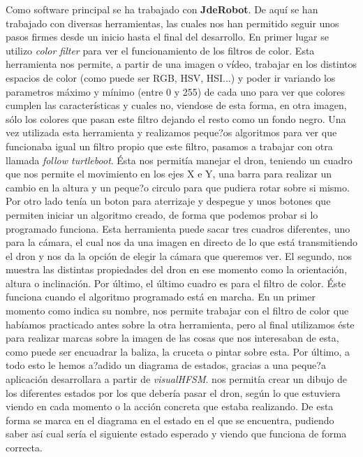 \hspace{1 cm} Como software principal se ha trabajado con \textbf{JdeRobot}. De aqu\'i se han trabajado con diversas herramientas, las cuales nos han permitido seguir unos pasos firmes desde un inicio hasta el final del desarrollo. 
En primer lugar se utilizo \textit{color filter} para ver el funcionamiento de los filtros de color. Esta herramienta nos permite, a partir de una imagen o v\'ideo, trabajar en los distintos espacios de color (como puede ser RGB, HSV, HSI...) y poder ir variando los parametros m\'aximo y m\'inimo (entre 0 y 255) de cada uno para ver que colores cumplen las caracter\'isticas y cuales no, viendose de esta forma, en otra imagen, s\'olo los colores que pasan este filtro dejando el resto como un fondo negro. 
Una vez utilizada esta herramienta y realizamos peque?os algoritmos para ver que funcionaba igual un filtro propio que este filtro, pasamos a trabajar con otra llamada \textit{follow turtleboot}. \'Esta  nos permit\'ia manejar el dron, teniendo un cuadro que nos permite el movimiento en los ejes X e Y, una barra para realizar un cambio en la altura y un peque?o circulo para que pudiera rotar sobre si mismo. Por otro lado ten\'ia un boton para aterrizaje y despegue y unos botones que permiten iniciar un algoritmo creado, de forma que podemos probar si lo programado funciona. Esta herramienta puede sacar tres cuadros diferentes, uno para la c\'amara, el cual nos da una imagen en directo de lo que est\'a transmitiendo el dron y nos da la opci\'on de elegir la c\'amara que queremos ver. El segundo, nos muestra las distintas propiedades del dron en ese momento como la orientaci\'on, altura o inclinaci\'on. Por \'ultimo, el \'ultimo cuadro es para el filtro de color. \'Este funciona cuando el algoritmo programado est\'a en marcha. En un primer momento como indica su nombre, nos permite trabajar con el filtro de color que hab\'iamos practicado antes sobre la otra herramienta, pero al final utilizamos \'este para realizar marcas sobre la imagen de las cosas que nos interesaban de esta, como puede ser encuadrar la baliza, la cruceta o pintar sobre esta. 
Por \'ultimo, a todo esto le hemos a?adido un diagrama de estados, gracias a una peque?a aplicaci\'on desarrollara a partir de \textit{visualHFSM}. nos permit\'ia crear un dibujo de los diferentes estados por los que deber\'ia pasar el dron, seg\'un lo que estuviera viendo en cada momento o la acci\'on concreta que estaba realizando. De esta forma se marca en el diagrama en el estado en el que se encuentra, pudiendo saber as\'i cual ser\'ia el siguiente estado esperado y viendo que funciona de forma correcta.

